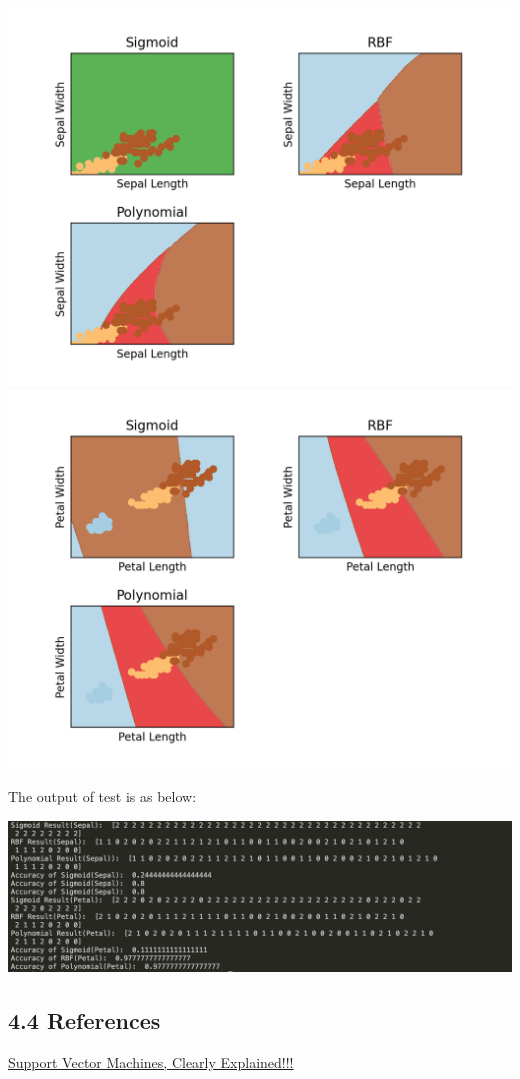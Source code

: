 \documentclass[12pt]{article}
\begin{document}
\begin{center}
    \includegraphics[scale=0.8]{fig/ec3.png}
    \includegraphics[scale=0.8]{fig/ec4.png} 
\end{center}
The output of test is as below: 
\begin{center}
    \includegraphics[scale=0.6]{fig/ec_output.png}
\end{center}
\subsection*{4.4 References}
\href{https://www.youtube.com/watch?v=efR1C6CvhmE}{Support Vector Machines, Clearly Explained!!!}
\end{document}
